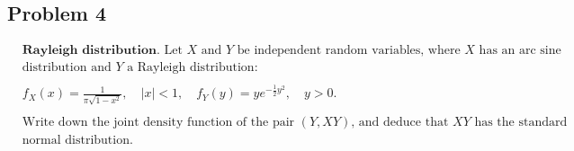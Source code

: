 \documentclass[letterpaper, 11pt]{article}
\newcommand{\1}{\mathds{1}}	%
\theoremstyle{definition}
\begin{document}
\subsection*{Problem 4}
\begin{align*}
   & \textbf{Rayleigh distribution.} \text{ Let $X$ and $Y$ be independent random variables, where $X$ has an arc sine} \\
    & \text{distribution and $Y$ a Rayleigh distribution:} \\
    & \\
    & f_X(x) = \frac{1}{\pi\sqrt{1-x^2}}, \quad |x| < 1, \quad f_Y(y) = ye^{-\frac{1}{2}y^2}, \quad y > 0. \\
    & \\
    & \text{Write down the joint density function of the pair $(Y, XY)$, and deduce that $XY$ has the standard} \\
    & \text{normal distribution.}
\end{align*}
\end{document}
